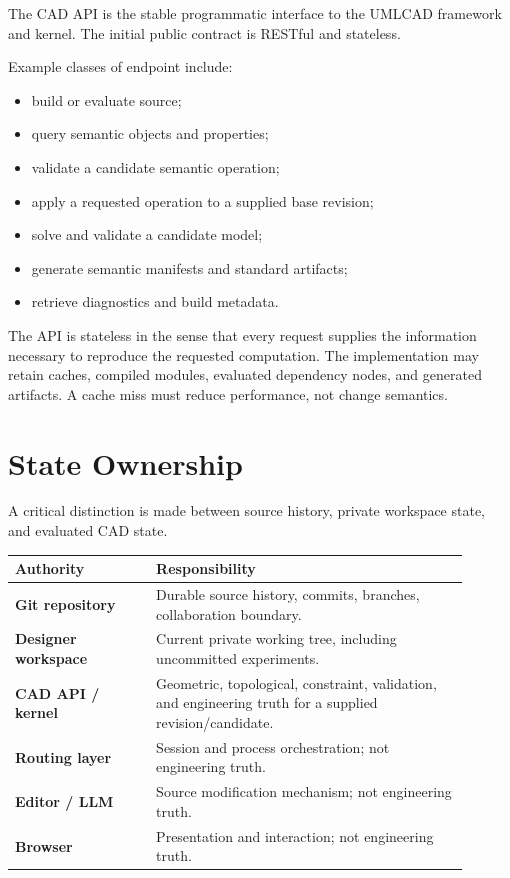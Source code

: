 \documentclass[11pt,a4paper]{article}
\begin{document}
The CAD API is the stable programmatic interface to the UMLCAD framework and kernel. The initial public contract is RESTful and stateless.

Example classes of endpoint include:
\begin{itemize}
    \item build or evaluate source;
    \item query semantic objects and properties;
    \item validate a candidate semantic operation;
    \item apply a requested operation to a supplied base revision;
    \item solve and validate a candidate model;
    \item generate semantic manifests and standard artifacts;
    \item retrieve diagnostics and build metadata.
\end{itemize}

The API is stateless in the sense that every request supplies the information necessary to reproduce the requested computation. The implementation may retain caches, compiled modules, evaluated dependency nodes, and generated artifacts. A cache miss must reduce performance, not change semantics.

\section{State Ownership}

A critical distinction is made between source history, private workspace state, and evaluated CAD state.

\begin{center}
\begin{tabular}{>{\bfseries}p{0.28\linewidth}p{0.62\linewidth}}
\toprule
Authority & Responsibility \\
\midrule
Git repository & Durable source history, commits, branches, collaboration boundary. \\
Designer workspace & Current private working tree, including uncommitted experiments. \\
CAD API / kernel & Geometric, topological, constraint, validation, and engineering truth for a supplied revision/candidate. \\
Routing layer & Session and process orchestration; not engineering truth. \\
Editor / LLM & Source modification mechanism; not engineering truth. \\
Browser & Presentation and interaction; not engineering truth. \\
\bottomrule
\end{tabular}
\end{center}
\end{document}

